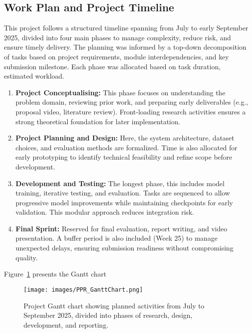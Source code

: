 \documentclass[12pt]{article}
\begin{document}
\subsection{Work Plan and Project Timeline}

This project follows a structured timeline spanning from July to early September 2025, divided into four main phases to manage complexity, reduce risk, and ensure timely delivery. The planning was informed by a top-down decomposition of tasks based on project requirements, module interdependencies, and key submission milestone. Each phase was allocated based on task duration, estimated workload.

\begin{enumerate}
    \item \textbf{Project Conceptualising:} This phase focuses on understanding the problem domain, reviewing prior work, and preparing early deliverables (e.g., proposal video, literature review). Front-loading research activities ensures a strong theoretical foundation for later implementation.

    \item \textbf{Project Planning and Design:} Here, the system architecture, dataset choices, and evaluation methods are formalized. Time is also allocated for early prototyping to identify technical feasibility and refine scope before development.

    \item \textbf{Development and Testing:} The longest phase, this includes model training, iterative testing, and evaluation. Tasks are sequenced to allow progressive model improvements while maintaining checkpoints for early validation. This modular approach reduces integration risk.

    \item \textbf{Final Sprint:} Reserved for final evaluation, report writing, and video presentation. A buffer period is also included (Week 25) to manage unexpected delays, ensuring submission readiness without compromising quality.
\end{enumerate}

Figure~\ref{fig:gantt} presents the Gantt chart

\begin{figure}[H]
    \centering
    \texttt{[image: images/PPR\_GanttChart.png]}
    \caption{Project Gantt chart showing planned activities from July to September 2025, divided into phases of research, design, development, and reporting.}
    \label{fig:gantt}
\end{figure}
\end{document}
